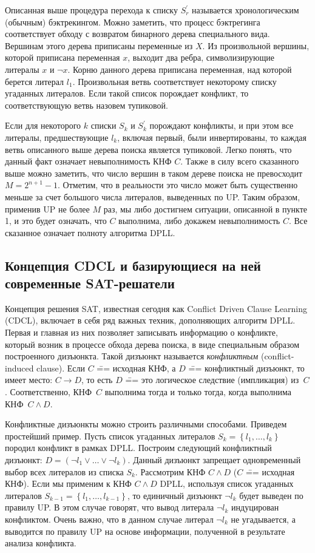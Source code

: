Описанная выше процедура перехода к списку $S_{r}^{'}$ называется хронологическим (обычным) бэктрекингом. Можно заметить, что процесс бэктрегинга соответствует обходу с возвратом бинарного дерева специального вида. Вершинам этого дерева приписаны переменные из $X$. Из произвольной вершины, которой приписана переменная $x$, выходит два ребра, символизирующие литералы $x$ и $\neg x$. Корню данного дерева приписана переменная, над которой берется литерал $l_{1}$. Произвольная ветвь соответствует некоторому списку угаданных литералов. Если такой список порождает конфликт, то соответствующую ветвь назовем тупиковой.

Если для некоторого $k$ списки $S_{k}$ и $S_{k}^{'}$ порождают конфликты, и при этом все литералы, предшествующие $l_{k}$, включая первый, были инвертированы, то каждая ветвь описанного выше дерева поиска является тупиковой. Легко понять, что данный факт означает невыполнимость КНФ $C$. Также в силу всего сказанного выше можно заметить, что число вершин в таком дереве поиска не превосходит $M = 2^{n + 1} - 1$. Отметим, что в реальности это число может быть существенно меньше за счет большого числа литералов, выведенных по UP. Таким образом, применив UP не более $M$ раз, мы либо достигнем ситуации, описанной в пункте 1, и это будет означать, что $C$ выполнима, либо докажем невыполнимость $C$. Все сказанное означает полноту алгоритма DPLL.

\subsection{Концепция CDCL и базирующиеся на ней современные SAT-решатели}

Концепция решения SAT, известная сегодня как Conflict Driven Clause Learning (CDCL), включает в себя ряд важных техник, дополняющих алгоритм DPLL. Первая и главная из них позволяет записывать информацию о конфликте, который возник в процессе обхода дерева поиска, в виде специальным образом построенного дизъюнкта. Такой дизъюнкт называется \textit{конфликтным} (conflict-induced clause). Если $C$ \=== исходная КНФ, а $D$ \=== конфликтный дизъюнкт, то имеет место: $C \to D$, то есть $D$ \=== это логическое следствие (импликация) из~$C$. Соответственно, КНФ~$C$ выполнима тогда и только тогда, когда выполнима КНФ~$C \land D$.

Конфликтные дизъюнкты можно строить различными способами. Приведем простейший пример. Пусть список угаданных литералов $S_{k} = \left\{ l_{1},\ldots,l_{k} \right\}$ породил конфликт в рамках DPLL. Построим следующий конфликтный дизъюнкт: $D = \left( \neg l_{1} \lor \ldots \lor \neg l_{k} \right)$. Данный дизъюнкт запрещает одновременный выбор всех литералов из списка $S_{k}$. Рассмотрим КНФ $C \land D$ ($C$ \=== исходная КНФ). Если мы применим к КНФ $C \land D$ DPLL, используя список угаданных литералов $S_{k - 1} = \left\{ l_{1},\ldots,l_{k - 1} \right\}$, то единичный дизъюнкт $\neg l_{k}$ будет выведен по правилу UP. В этом случае говорят, что вывод литерала $\neg l_{k}$ индуцирован конфликтом. Очень важно, что в данном случае литерал ${\neg l}_{k}$ не угадывается, а выводится по правилу UP на основе информации, полученной в результате анализа конфликта.

